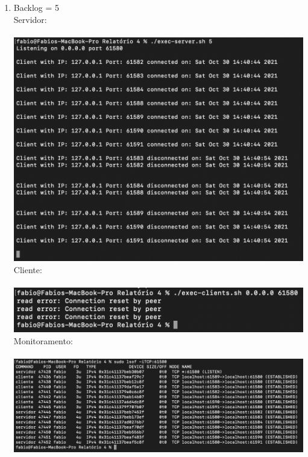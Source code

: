 \documentclass[12pt,a4paper]{report}
\begin{document}
\begin{enumerate}
\begin{enumerate}
        \item Backlog = 5\\
        Servidor:\\\\
        \includegraphics[width=1\textwidth]{images/servidor-backlog-5.png}
        Cliente:\\\\
        \includegraphics[width=1\textwidth]{images/cliente-backlog-5.png}
        Monitoramento:\\\\
        \includegraphics[width=1\textwidth]{images/lsof-backlog-5.png}
        

\end{enumerate}
\end{enumerate}
\end{document}
